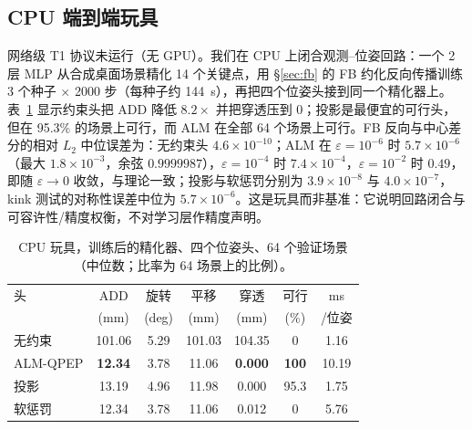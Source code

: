 \subsection{CPU 端到端玩具}\label{sec:e2e}
网络级 T1 协议未运行（无 GPU）。我们在 CPU 上闭合观测--位姿回路：一个 2 层 MLP 从合成桌面场景精化 14 个关键点，用 \S\ref{sec:fb} 的 FB 约化反向传播训练 3 个种子 $\times$ 2000 步（每种子约 144~s），再把四个位姿头接到同一个精化器上。表~\ref{tab:e2e} 显示约束头把 ADD 降低 $8.2\times$ 并把穿透压到 0；投影是最便宜的可行头，但在 95.3\% 的场景上可行，而 ALM 在全部 64 个场景上可行。FB 反向与中心差分的相对 $L_2$ 中位误差为：无约束头 $4.6\times10^{-10}$；ALM 在 $\varepsilon=10^{-6}$ 时 $5.7\times10^{-6}$（最大 $1.8\times10^{-3}$，余弦 $0.9999987$），$\varepsilon=10^{-4}$ 时 $7.4\times10^{-4}$，$\varepsilon=10^{-2}$ 时 $0.49$，即随 $\varepsilon\to0$ 收敛，与理论一致；投影与软惩罚分别为 $3.9\times10^{-8}$ 与 $4.0\times10^{-7}$，kink 测试的对称性误差中位为 $5.7\times10^{-6}$。这是玩具而非基准：它说明回路闭合与可容许性/精度权衡，不对学习层作精度声明。

\begin{table}[t]
\centering
\caption{CPU 玩具，训练后的精化器、四个位姿头、64 个验证场景（中位数；比率为 64 场景上的比例）。}
\label{tab:e2e}
\scriptsize
\setlength{\tabcolsep}{2.4pt}
\begin{tabular}{@{}lcccccc@{}}
\toprule
头 & ADD & 旋转 & 平移 & 穿透 & 可行 & ms \\
 & (mm) & (deg) & (mm) & (mm) & (\%) & /位姿 \\
\midrule
无约束 & 101.06 & 5.29 & 101.03 & 104.35 & 0 & 1.16 \\
ALM-QPEP & \textbf{12.34} & 3.78 & 11.06 & \textbf{0.000} & \textbf{100} & 10.19 \\
投影 & 13.19 & 4.96 & 11.98 & 0.000 & 95.3 & 1.75 \\
软惩罚 & 12.34 & 3.78 & 11.06 & 0.012 & 0 & 5.76 \\
\bottomrule
\end{tabular}
\end{table}

